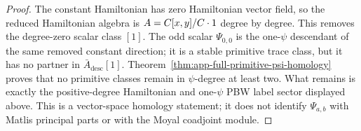 \begin{proof}
  The constant Hamiltonian has zero Hamiltonian vector field, so the
  reduced Hamiltonian algebra is \(A=C[x,y]/C\cdot1\) degree by
  degree.  This removes the degree-zero scalar class \([1]\).  The odd
  scalar \(\Psi_{0,0}\) is the one-\(\psi\) descendant of the same removed
  constant direction; it is a stable primitive trace class, but it has no
  partner in \(\bar A_{\mathrm{desc}}[1]\).  Theorem~\ref{thm:app-full-primitive-psi-homology}
  proves that no primitive classes remain in \(\psi\)-degree at least
  two.  What remains is exactly the positive-degree Hamiltonian and
  one-\(\psi\) PBW label sector displayed above.  This is a vector-space
  homology statement; it does not identify \(\Psi_{a,b}\) with Matlis
  principal parts or with the Moyal coadjoint module.
\end{proof}
